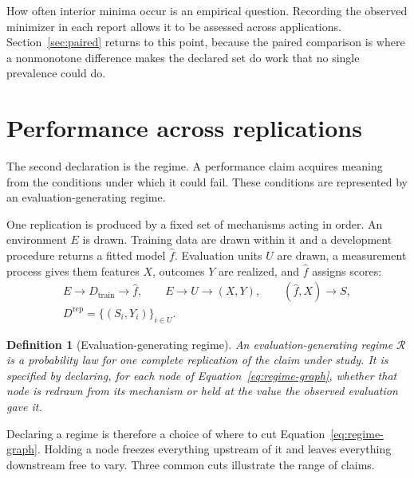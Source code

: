 \documentclass[11pt]{article}
\newcommand{\Regime}{\mathcal{R}}
\newtheorem{definition}{Definition}
\theoremstyle{remark}
\begin{document}
How often interior minima occur is an empirical question. Recording the observed minimizer in each report allows it to be assessed across applications. Section~\ref{sec:paired} returns to this point, because the paired comparison is where a nonmonotone difference makes the declared set do work that no single prevalence could do.

\section{Performance across replications}
\label{sec:regime}

The second declaration is the regime. A performance claim acquires meaning from the conditions under which it could fail. These conditions are represented by an evaluation-generating regime.

One replication is produced by a fixed set of mechanisms acting in order. An environment $E$ is drawn. Training data are drawn within it and a development procedure returns a fitted model $\widehat f$. Evaluation units $U$ are drawn, a measurement process gives them features $X$, outcomes $Y$ are realized, and $\widehat f$ assigns scores:
\begin{equation}
\begin{gathered}
E\longrightarrow D_{\mathrm{train}}\longrightarrow\widehat f,
\qquad
E\longrightarrow U\longrightarrow(X,Y),
\qquad
(\widehat f,X)\longrightarrow S,
\\
D^{\mathrm{rep}}=\{(S_i,Y_i)\}_{i\in U}.
\end{gathered}
\label{eq:regime-graph}
\end{equation}

\begin{definition}[Evaluation-generating regime]
An evaluation-generating regime $\Regime$ is a probability law for one complete replication of the claim under study. It is specified by declaring, for each node of Equation~\eqref{eq:regime-graph}, whether that node is redrawn from its mechanism or held at the value the observed evaluation gave it.
\end{definition}

Declaring a regime is therefore a choice of where to cut Equation~\eqref{eq:regime-graph}. Holding a node freezes everything upstream of it and leaves everything downstream free to vary. Three common cuts illustrate the range of claims.
\end{document}
